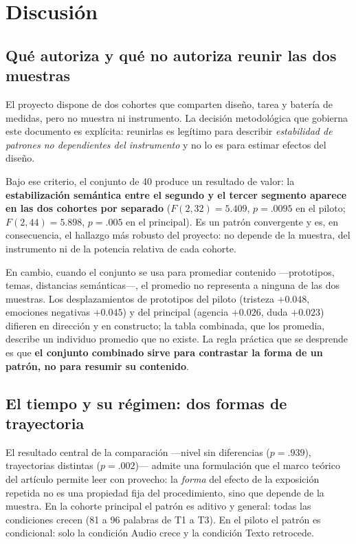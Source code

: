 \documentclass[12pt]{article}
\begin{document}
\section{Discusión}

\subsection{Qué autoriza y qué no autoriza reunir las dos muestras}

El proyecto dispone de dos cohortes que comparten diseño, tarea y batería de medidas, pero no
muestra ni instrumento. La decisión metodológica que gobierna este documento es explícita:
reunirlas es legítimo para describir \emph{estabilidad de patrones no dependientes del
instrumento} y no lo es para estimar efectos del diseño.

Bajo ese criterio, el conjunto de 40 produce un resultado de valor: la
\textbf{estabilización semántica entre el segundo y el tercer segmento aparece en las dos
cohortes por separado} ($F(2,32) = 5.409$, $p = .0095$ en el piloto;
$F(2,44) = 5.898$, $p = .005$ en el principal). Es un patrón convergente y es, en consecuencia,
el hallazgo más robusto del proyecto: no depende de la muestra, del instrumento ni de la
potencia relativa de cada cohorte.

En cambio, cuando el conjunto se usa para promediar contenido —prototipos, temas, distancias
semánticas—, el promedio no representa a ninguna de las dos muestras. Los desplazamientos de
prototipos del piloto (tristeza $+0.048$, emociones negativas $+0.045$) y del principal
(agencia $+0.026$, duda $+0.023$) difieren en dirección y en constructo; la tabla combinada, que
los promedia, describe un individuo promedio que no existe. La regla práctica que se desprende
es que \textbf{el conjunto combinado sirve para contrastar la forma de un patrón, no para
resumir su contenido}.

\subsection{El tiempo y su régimen: dos formas de trayectoria}

El resultado central de la comparación —nivel sin diferencias ($p = .939$), trayectorias
distintas ($p = .002$)— admite una formulación que el marco teórico del artículo permite leer
con provecho: la \emph{forma} del efecto de la exposición repetida no es una propiedad fija del
procedimiento, sino que depende de la muestra. En la cohorte principal el patrón es aditivo y
general: todas las condiciones crecen (81 a 96 palabras de T1 a T3). En el piloto el patrón es
condicional: solo la condición Audio crece y la condición Texto retrocede.
\end{document}
